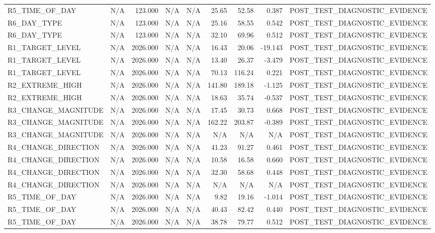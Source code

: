 \begin{table}[h!]
\begin{tabular}{lrrrrrrrr}
R5\_TIME\_OF\_DAY & N/A & 123.000 & N/A & N/A & 25.65 & 52.58 & 0.387 & POST\_TEST\_DIAGNOSTIC\_EVIDENCE \\
R6\_DAY\_TYPE & N/A & 123.000 & N/A & N/A & 25.16 & 58.55 & 0.542 & POST\_TEST\_DIAGNOSTIC\_EVIDENCE \\
R6\_DAY\_TYPE & N/A & 123.000 & N/A & N/A & 32.10 & 69.96 & 0.512 & POST\_TEST\_DIAGNOSTIC\_EVIDENCE \\
R1\_TARGET\_LEVEL & N/A & 2026.000 & N/A & N/A & 16.43 & 20.06 & -19.143 & POST\_TEST\_DIAGNOSTIC\_EVIDENCE \\
R1\_TARGET\_LEVEL & N/A & 2026.000 & N/A & N/A & 13.40 & 26.37 & -3.479 & POST\_TEST\_DIAGNOSTIC\_EVIDENCE \\
R1\_TARGET\_LEVEL & N/A & 2026.000 & N/A & N/A & 70.13 & 116.24 & 0.221 & POST\_TEST\_DIAGNOSTIC\_EVIDENCE \\
R2\_EXTREME\_HIGH & N/A & 2026.000 & N/A & N/A & 141.80 & 189.18 & -1.125 & POST\_TEST\_DIAGNOSTIC\_EVIDENCE \\
R2\_EXTREME\_HIGH & N/A & 2026.000 & N/A & N/A & 18.63 & 35.74 & -0.537 & POST\_TEST\_DIAGNOSTIC\_EVIDENCE \\
R3\_CHANGE\_MAGNITUDE & N/A & 2026.000 & N/A & N/A & 17.45 & 30.73 & 0.668 & POST\_TEST\_DIAGNOSTIC\_EVIDENCE \\
R3\_CHANGE\_MAGNITUDE & N/A & 2026.000 & N/A & N/A & 162.22 & 203.87 & -0.389 & POST\_TEST\_DIAGNOSTIC\_EVIDENCE \\
R3\_CHANGE\_MAGNITUDE & N/A & 2026.000 & N/A & N/A & N/A & N/A & N/A & POST\_TEST\_DIAGNOSTIC\_EVIDENCE \\
R4\_CHANGE\_DIRECTION & N/A & 2026.000 & N/A & N/A & 41.23 & 91.27 & 0.461 & POST\_TEST\_DIAGNOSTIC\_EVIDENCE \\
R4\_CHANGE\_DIRECTION & N/A & 2026.000 & N/A & N/A & 10.58 & 16.58 & 0.660 & POST\_TEST\_DIAGNOSTIC\_EVIDENCE \\
R4\_CHANGE\_DIRECTION & N/A & 2026.000 & N/A & N/A & 32.30 & 58.68 & 0.448 & POST\_TEST\_DIAGNOSTIC\_EVIDENCE \\
R4\_CHANGE\_DIRECTION & N/A & 2026.000 & N/A & N/A & N/A & N/A & N/A & POST\_TEST\_DIAGNOSTIC\_EVIDENCE \\
R5\_TIME\_OF\_DAY & N/A & 2026.000 & N/A & N/A & 9.82 & 19.16 & -1.014 & POST\_TEST\_DIAGNOSTIC\_EVIDENCE \\
R5\_TIME\_OF\_DAY & N/A & 2026.000 & N/A & N/A & 40.43 & 82.42 & 0.440 & POST\_TEST\_DIAGNOSTIC\_EVIDENCE \\
R5\_TIME\_OF\_DAY & N/A & 2026.000 & N/A & N/A & 38.78 & 79.77 & 0.512 & POST\_TEST\_DIAGNOSTIC\_EVIDENCE \\

\end{tabular}
\end{table}
